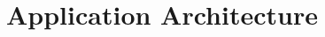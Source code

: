\documentclass[../main.tex]{subfiles}
\begin{document}
\chapter{Application Architecture}



\end{document}
